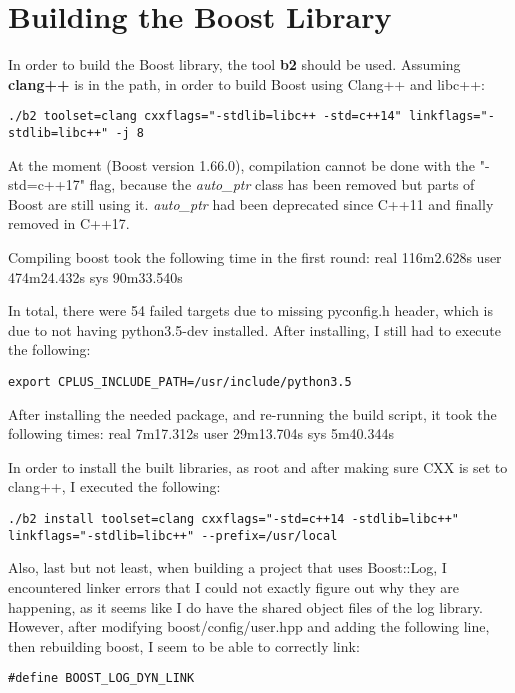 \chapter{Building the Boost Library}

In order to build the Boost library, the tool \textbf{b2} should be used. Assuming \textbf{clang++} is in the path, in order to build Boost using Clang++ and libc++:

\begin{lstlisting}
./b2 toolset=clang cxxflags="-stdlib=libc++ -std=c++14" linkflags="-stdlib=libc++" -j 8
\end{lstlisting}

At the moment (Boost version 1.66.0), compilation cannot be done with the "-std=c++17" flag, because the \textit{auto_ptr} class has been removed but parts of Boost are still using it. \textit{auto_ptr} had been deprecated since C++11 and finally removed in C++17.

Compiling boost took the following time in the first round:
real	116m2.628s
user	474m24.432s
sys	90m33.540s

In total, there were 54 failed targets due to missing pyconfig.h header, which is due to not having python3.5-dev installed. After installing, I still had to execute the following:
\begin{lstlisting}
export CPLUS_INCLUDE_PATH=/usr/include/python3.5
\end{lstlisting}

After installing the needed package, and re-running the build script, it took the following times:
real	7m17.312s
user	29m13.704s
sys	5m40.344s

In order to install the built libraries, as root and after making sure CXX is set to clang++, I executed the following:
\begin{lstlisting}
./b2 install toolset=clang cxxflags="-std=c++14 -stdlib=libc++" linkflags="-stdlib=libc++" --prefix=/usr/local
\end{lstlisting}

Also, last but not least, when building a project that uses Boost::Log, I encountered linker errors that I could not exactly figure out why they are happening, as it seems like I do have the shared object files of the log library. However, after modifying boost/config/user.hpp and adding the following line, then rebuilding boost, I seem to be able to correctly link:
\begin{lstlisting}
#define BOOST_LOG_DYN_LINK
\end{lstlisting}
